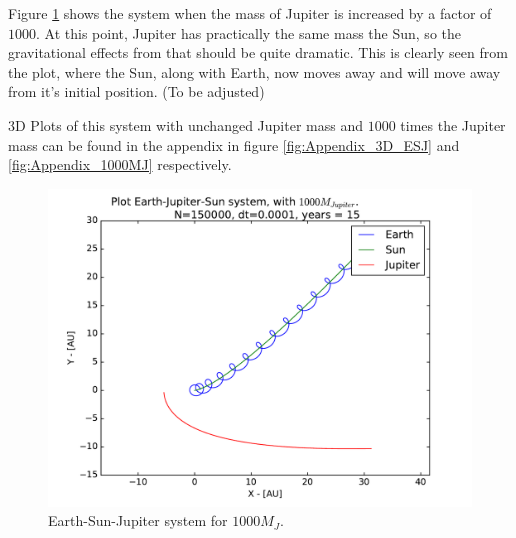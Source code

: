 \documentclass[12pt]{article}
\begin{document}
Figure \ref{fig:ESJ_1000MJ} shows the system when the mass of Jupiter is increased by a factor of $1000$. At this point, Jupiter has practically the same mass the Sun, so the gravitational effects from that should be quite dramatic. This is clearly seen from the plot, where the Sun, along with Earth, now moves away and will move away from it's initial position. (To be adjusted)

3D Plots of this system with unchanged Jupiter mass and $1000$ times the Jupiter mass can be found in the appendix in figure \ref{fig:Appendix_3D_ESJ} and \ref{fig:Appendix_1000MJ} respectively.

\begin{figure}[!h]
\centering
\includegraphics[width=\linewidth]{Plots/Earth_Sun_Jupiter_1000MJ.pdf}
\caption{Earth-Sun-Jupiter system for $1000M_J$.}
\label{fig:ESJ_1000MJ}
\end{figure}

\FloatBarrier
\end{document}
